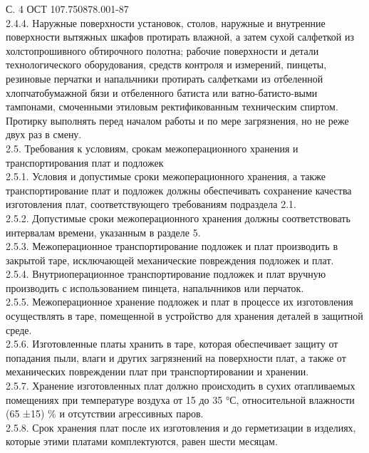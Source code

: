 \documentclass{bmstu}
\begin{document}
	С. 4 ОСТ 107.750878.001-87 \\
	2.4.4. Наружные поверхности установок, столов, наружные и внутренние поверхности вытяжных шкафов протирать влажной, а затем сухой салфеткой из холстопрошивного обтирочного полотна; рабочие поверхности и детали технологического оборудования, средств контроля и измерений, пинцеты, резиновые перчатки и напальчники протирать салфетками из отбеленной хлопчатобумажной бязи и отбеленного батиста или ватно-батисто-выми тампонами, смоченными этиловым ректификованным техническим спиртом.
	Протирку выполнять перед началом работы и по мере загрязнения, но не реже двух раз в смену. \\
	2.5. Требования к условиям, срокам межоперационного хранения и транспортирования плат и подложек \\
	2.5.1. Условия и допустимые сроки межоперационного хранения, а также транспортирование плат и подложек должны обеспечивать сохранение качества изготовления плат, соответствующего требованиям подраздела 2.1. \\
	2.5.2. Допустимые сроки межоперационного хранения должны соответствовать интервалам времени, указанным в разделе 5. \\
	2.5.3. Межоперационное транспортирование подложек и плат производить в закрытой таре, исключающей механические повреждения подложек и плат. \\
	2.5.4. Внутриоперационное транспортирование подложек и плат вручную производить с использованием пинцета, напальчников или перчаток. \\
	2.5.5. Межоперационное хранение подложек и плат в процессе их изготовления осуществлять в таре, помещенной в устройство для хранения деталей в защитной среде. \\
	2.5.6. Изготовленные платы хранить в таре, которая обеспечивает защиту от попадания пыли, влаги и других загрязнений на поверхности плат, а также от механических повреждении плат при транспортировании и хранении. \\
	2.5.7. Хранение изготовленных плат должно происходить в сухих отапливаемых помещениях при температуре воздуха от 15 до 35 °С, относительной влажности (65 ±15) \% и отсутствии агрессивных паров. \\
	2.5.8. Срок хранения плат после их изготовления и до герметизации в изделиях, которые этими платами комплектуются, равен шести месяцам. \\
	
\end{document}
